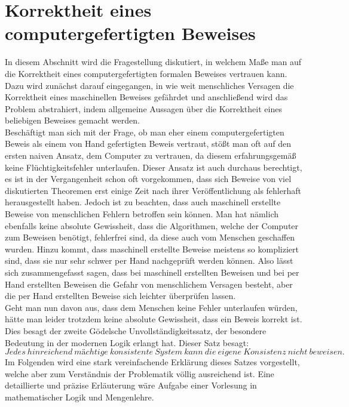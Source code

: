 \section{Korrektheit eines computergefertigten Beweises}
In diesem Abschnitt wird die Fragestellung diskutiert, in welchem Maße man auf die Korrektheit eines computergefertigten formalen Beweises vertrauen kann. Dazu wird zunächst darauf eingegangen, in wie weit menschliches Versagen die Korrektheit eines maschinellen Beweises gefährdet und anschließend wird das Problem abstrahiert, indem allgemeine Aussagen über die Korrektheit eines beliebigen Beweises gemacht werden.\\
Beschäftigt man sich mit der Frage, ob man eher einem computergefertigten Beweis als einem von Hand gefertigten Beweis vertraut, stößt man oft auf den ersten naiven Ansatz, dem Computer zu vertrauen, da diesem erfahrungsgemäß keine Flüchtigkeitsfehler unterlaufen. Dieser Ansatz ist auch durchaus berechtigt, es ist in der Vergangenheit schon oft vorgekommen, dass sich Beweise von viel diskutierten Theoremen erst einige Zeit nach ihrer Veröffentlichung als fehlerhaft herausgestellt haben. Jedoch ist zu beachten, dass auch maschinell erstellte Beweise von menschlichen Fehlern betroffen sein können. Man hat nämlich ebenfalls keine absolute Gewissheit, dass die Algorithmen, welche der Computer zum Beweisen benötigt, fehlerfrei sind, da diese auch vom Menschen geschaffen wurden. Hinzu kommt, dass maschinell erstellte Beweise meistens so kompliziert sind, dass sie nur sehr schwer per Hand nachgeprüft werden können. Also lässt sich zusammengefasst sagen, dass bei maschinell erstellten Beweisen und bei per Hand erstellten Beweisen die Gefahr von menschlichem Versagen besteht, aber die per Hand erstellten Beweise sich leichter überprüfen lassen.\\
Geht man nun davon aus, dass dem Menschen keine Fehler unterlaufen würden, hätte man leider trotzdem keine absolute Gewissheit, dass ein Beweis korrekt ist. Dies besagt der zweite Gödelsche Unvollständigkeitssatz, der besondere Bedeutung in der modernen Logik erlangt hat. Dieser Satz besagt:
\begin{equation*}
Jedes\ hinreichend\ mächtige\ konsistente\ System\ kann\ die\ eigene\ Konsistenz\ nicht\ beweisen.
\end{equation*}
Im Folgenden wird eine stark vereinfachende Erklärung dieses Satzes vorgestellt, welche aber zum Verständnis der Problematik völlig ausreichend ist. Eine detaillierte und präzise Erläuterung wäre Aufgabe einer Vorlesung in mathematischer Logik und Mengenlehre.\\
